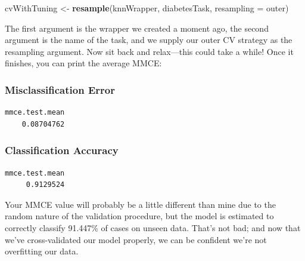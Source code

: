 \documentclass[
]{article}
\newenvironment{Shaded}{\begin{snugshade}}{\end{snugshade}}
\newcommand{\AttributeTok}[1]{\textcolor[rgb]{0.13,0.29,0.53}{#1}}
\newcommand{\DecValTok}[1]{\textcolor[rgb]{0.00,0.00,0.81}{#1}}
\newcommand{\FunctionTok}[1]{\textcolor[rgb]{0.13,0.29,0.53}{\textbf{#1}}}
\newcommand{\NormalTok}[1]{#1}
\newcommand{\OtherTok}[1]{\textcolor[rgb]{0.56,0.35,0.01}{#1}}
\newcommand{\SpecialCharTok}[1]{\textcolor[rgb]{0.81,0.36,0.00}{\textbf{#1}}}
\begin{document}
\begin{Shaded}
\begin{Highlighting}[]
\NormalTok{cvWithTuning }\OtherTok{\textless{}{-}} \FunctionTok{resample}\NormalTok{(knnWrapper, diabetesTask, }\AttributeTok{resampling =}\NormalTok{ outer)}
\end{Highlighting}
\end{Shaded}

The first argument is the wrapper we created a moment ago, the second
argument is the name of the task, and we supply our outer CV strategy as
the resampling argument. Now sit back and relax---this could take a
while! Once it finishes, you can print the average MMCE:

\subsubsection{Misclassification Error}\label{misclassification-error}

\begin{Shaded}
\end{Shaded}

\begin{verbatim}
mmce.test.mean 
    0.08704762 
\end{verbatim}

\subsubsection{Classification Accuracy}\label{classification-accuracy}

\begin{Shaded}
\end{Shaded}

\begin{verbatim}
mmce.test.mean 
     0.9129524 
\end{verbatim}

Your MMCE value will probably be a little different than mine due to the
random nature of the validation procedure, but the model is estimated to
correctly classify 91.447\% of cases on unseen data. That's not bad; and
now that we've cross-validated our model properly, we can be confident
we're not overfitting our data.
\end{document}
